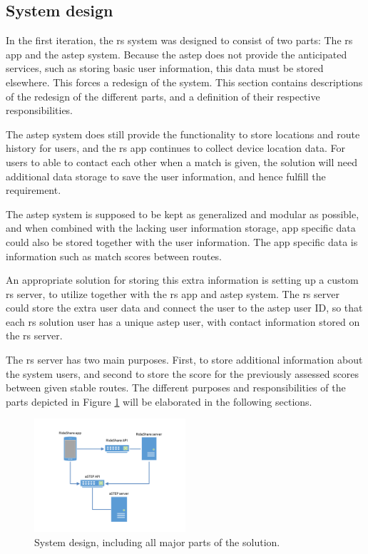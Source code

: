 \subsection{System design}\label{sec:s2systemdesign}
In the first iteration, the \gls{rs} system was designed to consist of two parts: The \gls{rs} app and the \gls{astep} system.
Because the \gls{astep} does not provide the anticipated services, such as storing basic user information, this data must be stored elsewhere.
This forces a redesign of the system.
This section contains descriptions of the redesign of the different parts, and a definition of their respective responsibilities.


The \gls{astep} system does still provide the functionality to store locations and route history for users, and the \gls{rs} app continues to collect device location data.  
For users to able to contact each other when a match is given, the solution will need additional data storage to save the user information, and hence fulfill the requirement.


The \gls{astep} system is supposed to be kept as generalized and modular as possible, and when combined with the lacking user information storage, app specific data could also be stored together with the user information.
The app specific data is information such as match scores between routes.


An appropriate solution for storing this extra information is setting up a custom \gls{rs} server, to utilize together with the \gls{rs} app and \gls{astep} system.
The \gls{rs} server could store the extra user data and connect the user to the \gls{astep} user ID, so that each \gls{rs} solution user has a unique \gls{astep} user, with contact information stored on the \gls{rs} server.

The \gls{rs} server has two main purposes.
First, to store additional information about the system users, and second to store the score for the previously assessed scores between given stable routes.
The different purposes and responsibilities of the parts depicted in Figure \ref{fig:s2systemdesign} will be elaborated in the following sections.
\begin{figure}
	\vspace{-12pt}
	\centering
	\includegraphics[width=0.5\textwidth,trim={4cm 2cm 4cm 2cm},clip]{figures/SystemDesign.png}
	\caption{System design, including all major parts of the solution.}
	\vspace{-12pt}
	\label{fig:s2systemdesign}
\end{figure}

